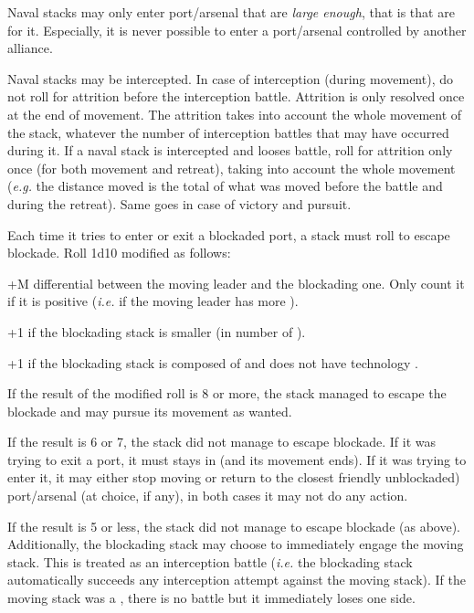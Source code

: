Naval stacks may only enter port/arsenal that are \emph{large enough}, that is
that are \SoS for it. Especially, it is never possible to enter a port/arsenal
controlled by another alliance.

Naval stacks may be intercepted. In case of interception (during movement), do
not roll for attrition before the interception battle. Attrition is only
resolved once at the end of movement. The attrition takes into account the
whole movement of the stack, whatever the number of interception battles that
may have occurred during it. If a naval stack is intercepted and looses
battle, roll for attrition only once (for both movement and retreat), taking
into account the whole movement (\emph{e.g.} the distance moved is the total
of what was moved before the battle and during the retreat). Same goes in case
of victory and pursuit.

Each time it tries to enter or exit a blockaded port, a stack must roll to
escape blockade. Roll 1d10 modified as follows:
\begin{modlist}
\item[+M] \Man differential between the moving leader and the blockading
  one. Only count it if it is positive (\emph{i.e.} if the moving leader has
  more \Man).
\item[+1] if the blockading stack is smaller (in number of \ND).
\item[+1] if the blockading stack is composed of \NWD and does not have
  technology \TSF.
\end{modlist}

If the result of the modified roll is 8 or more, the stack managed to escape
the blockade and may pursue its movement as wanted.

If the result is 6 or 7, the stack did not manage to escape blockade. If it
was trying to exit a port, it must stays in (and its movement ends). If it was
trying to enter it, it may either stop moving or return to the closest
friendly unblockaded) port/arsenal (at choice, if any), in both cases it may
not do any action.

If the result is 5 or less, the stack did not manage to escape blockade (as
above). Additionally, the blockading stack may choose to immediately engage
the moving stack. This is treated as an interception battle (\emph{i.e.} the
blockading stack automatically succeeds any interception attempt against the
moving stack). If the moving stack was a \corsaire, there is no battle but it
immediately loses one side.

